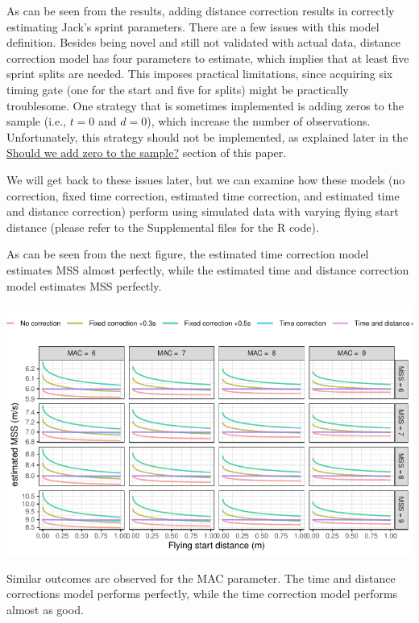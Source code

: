 \documentclass[fleqn,10pt,lineno]{wlpeerj} %
\begin{document}
As can be seen from the results, adding distance correction results in correctly estimating Jack's sprint parameters. There are a few issues with this model definition. Besides being novel and still not validated with actual data, distance correction model has four parameters to estimate, which implies that at least five sprint splits are needed. This imposes practical limitations, since acquiring six timing gate (one for the start and five for splits) might be practically troublesome. One strategy that is sometimes implemented is adding zeros to the sample (i.e., \(t=0\) and \(d=0\)), which increase the number of observations. Unfortunately, this strategy should not be implemented, as explained later in the \protect\hyperlink{should-we-add-zero-to-the-sample}{Should we add zero to the sample?} section of this paper.

We will get back to these issues later, but we can examine how these models (no correction, fixed time correction, estimated time correction, and estimated time and distance correction) perform using simulated data with varying flying start distance (please refer to the Supplemental files for the R code).

As can be seen from the next figure, the estimated time correction model estimates MSS almost perfectly, while the estimated time and distance correction model estimates MSS perfectly.

\begin{center}\includegraphics[width=0.9\linewidth]{paper_files/figure-latex/unnamed-chunk-37-1} \end{center}

Similar outcomes are observed for the MAC parameter. The time and distance corrections model performs perfectly, while the time correction model performs almost as good.
\end{document}
